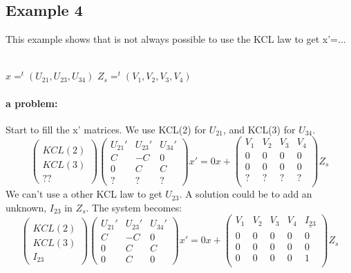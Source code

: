 \subsection{Example 4}
This example shows that is not always possible to use the KCL law to get x'=...\\
\begin{figure}[h]
\centerline{
 \scalebox{0.9}{
    
 }
}\end{figure}\\
$x=^{t}(U_{21},U_{23},U_{34})$
$Z_{s}=^{t}(V_{1},V_{2},V_{3},V_{4})$
\paragraph{a problem:}
Start to fill the x' matrices. We use KCL(2) for $U_{21}$, and KCL(3) for $U_{34}$.
\[\left(\begin{array}{c}
  \\
KCL(2)\\KCL(3)\\??
\end{array}\right)
\left(\begin{array}{ccc}
  U_{21}'&U_{23}'&U_{34}'\\
  \hline
  C&-C&0\\
  0&C&C\\
  ?&?&?
\end{array}\right)x'=0x+
\left(\begin{array}{cccc}
  V_{1}&V_{2}&V_{3}&V_{4}\\
  \hline
  0&0&0&0\\
  0&0&0&0\\
  ?&?&?&?\\
\end{array}\right)Z_{s}
 \]
 We can't use a other KCL law to get $U_{23}$. A solution could be to add an unknown, \underline{$I_{23}$} in
 $Z_{s}$. The system becomes:\\
 \[\left(\begin{array}{c}
  \\
KCL(2)\\KCL(3)\\I_{23}
\end{array}\right)
\left(\begin{array}{ccc}
  U_{21}'&U_{23}'&U_{34}'\\
  \hline
  C&-C&0\\
  0&C&C\\
  0&C&0
\end{array}\right)x'=0x+
\left(\begin{array}{ccccc}
  V_{1}&V_{2}&V_{3}&V_{4}&\underline{I_{23}}\\
  \hline
  0&0&0&0&0\\
  0&0&0&0&0\\
  0&0&0&0&1\\
\end{array}\right)Z_{s}
 \]
